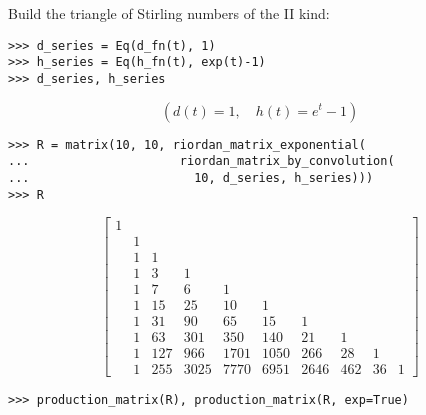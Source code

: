 \begin{example}
Build the triangle of Stirling numbers of the II kind:
\begin{verbatim}
>>> d_series = Eq(d_fn(t), 1)
>>> h_series = Eq(h_fn(t), exp(t)-1)
>>> d_series, h_series
\end{verbatim}
\begin{displaymath}
\left ( d{\left (t \right )} = 1, \quad h{\left (t \right )} = e^{t} - 1\right )
\end{displaymath}
\begin{verbatim}
>>> R = matrix(10, 10, riordan_matrix_exponential(
...                     riordan_matrix_by_convolution(
...                       10, d_series, h_series)))
>>> R
\end{verbatim}
\begin{displaymath}
\left[\begin{matrix}1 &   &   &   &   &   &   &   &   &  \\  & 1 &   &   &   &   &   &   &   &  \\  & 1 & 1 &   &   &   &   &   &   &  \\  & 1 & 3 & 1 &   &   &   &   &   &  \\  & 1 & 7 & 6 & 1 &   &   &   &   &  \\  & 1 & 15 & 25 & 10 & 1 &   &   &   &  \\  & 1 & 31 & 90 & 65 & 15 & 1 &   &   &  \\  & 1 & 63 & 301 & 350 & 140 & 21 & 1 &   &  \\  & 1 & 127 & 966 & 1701 & 1050 & 266 & 28 & 1 &  \\  & 1 & 255 & 3025 & 7770 & 6951 & 2646 & 462 & 36 & 1\end{matrix}\right]
\end{displaymath}
\begin{verbatim}
>>> production_matrix(R), production_matrix(R, exp=True)
\end{verbatim}
\begin{displaymath}

\end{displaymath}
\end{example}
